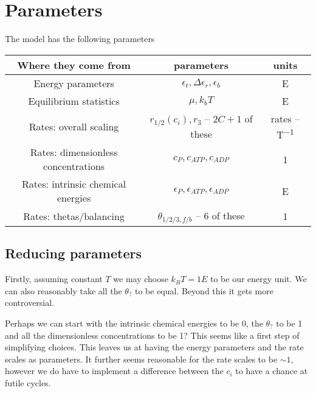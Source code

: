 \documentclass[11pt]{article}
\begin{document}
\section{Parameters}
The model has the following parameters
\begin{table}[H]
    \centering
    \begin{tabular}{c|c|c}
        Where they come from & parameters & units \\
        \hline
        Energy parameters & $\epsilon_t, \Delta\epsilon_r, \epsilon_b$ & \si{E} \\
        Equilibrium statistics & $\mu, \si{k_b}T$ & \si{E} \\
        Rates: overall scaling & $r_{1/2}(c_i),r_3$ -- $2C+1$ of these & rates -- \si{T^{-1}} \\
        Rates: dimensionless concentrations & $c_P,c_{ATP},c_{ADP}$ & \si{1} \\
        Rates: intrinsic chemical energies & $\epsilon_P,\epsilon_{ATP},\epsilon_{ADP}$ & \si{E} \\
        Rates: thetas/balancing & $\theta_{1/2/3,f/b}$ -- 6 of these & \si{1} \\
    \end{tabular}
\end{table}

\subsection{Reducing parameters}
Firstly, assuming constant $T$ we may choose $\si{k_B}T = 1\si{E}$ to be our energy unit.
We can also reasonably take all the $\theta_?$ to be equal.
Beyond this it gets more controversial.

Perhaps we can start with the intrinsic chemical energies to be 0, the $\theta_?$ to be 1 and all the dimensionless concentrations to be 1?
This seems like a first step of simplifying choices.
This leaves us at having the energy parameters and the rate scales as parameters.
It further seems reasonable for the rate scales to be ${\sim}1$, however we do have to implement a difference between the $c_i$ to have a chance at futile cycles.
\end{document}
